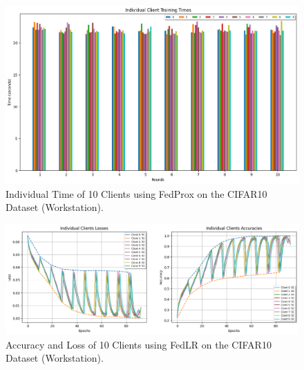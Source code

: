 \documentclass[conference]{IEEEtran}
\begin{document}
\begin{figure}[htp!]
	\centering
	\includegraphics[scale=.3]{Images/Result Images/CIFAR 10/cifar10_fedPROX_total_time_622o28 }
	\caption{Individual Time of 10 Clients using FedProx on the CIFAR10 Dataset (Workstation).}
	\label{FedProxTimeC10}
\end{figure}



\begin{figure}[htp!]
	\centering
	\includegraphics[scale=.28]{Images/Result Images/CIFAR 10/cifar10_mystrat_lossacc }
	\caption{Accuracy and Loss of 10 Clients using FedLR on the CIFAR10 Dataset (Workstation).}
	\label{FedLRC10}
\end{figure}
\end{document}
